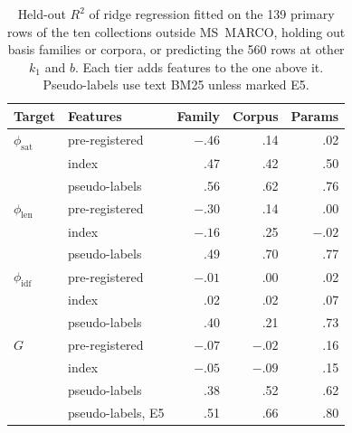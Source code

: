 \documentclass[11pt]{article}
\begin{document}
\begin{table}[t]
\centering
\small
\setlength{\tabcolsep}{3pt}
\begin{tabular}{@{}llrrr@{}}
\toprule
Target & Features & Family & Corpus & Params \\
\midrule
$\phi_{\mathrm{sat}}$ & pre-registered & $-.46$ & .14 & .02 \\
 & index & .47 & .42 & .50 \\
 & pseudo-labels & .56 & .62 & .76 \\
$\phi_{\mathrm{len}}$ & pre-registered & $-.30$ & .14 & .00 \\
 & index & $-.16$ & .25 & $-.02$ \\
 & pseudo-labels & .49 & .70 & .77 \\
$\phi_{\mathrm{idf}}$ & pre-registered & $-.01$ & .00 & .02 \\
 & index & .02 & .02 & .07 \\
 & pseudo-labels & .40 & .21 & .73 \\
$G$ & pre-registered & $-.07$ & $-.02$ & .16 \\
 & index & $-.05$ & $-.09$ & .15 \\
 & pseudo-labels & .38 & .52 & .62 \\
 & pseudo-labels, E5 & .51 & .66 & .80 \\
\bottomrule
\end{tabular}
\caption{Held-out $R^2$ of ridge regression fitted on the 139 primary rows of the ten
collections outside MS~MARCO, holding out basis families or corpora, or predicting the
560 rows at other $k_1$ and $b$. Each tier adds features to the one above it.
Pseudo-labels use text BM25 unless marked E5.}
\label{tab:predictor}
\end{table}
\end{document}
